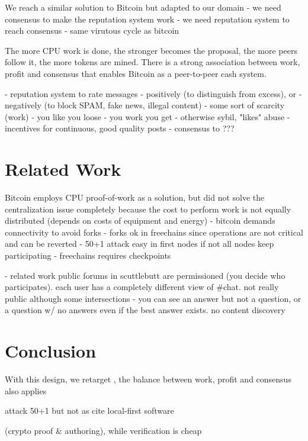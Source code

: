 \documentclass[10pt,journal,compsoc]{IEEEtran}
\begin{document}
We reach a similar solution to Bitcoin but adapted to our domain
- we need consensus to make the reputation system work
- we need reputation system to reach consensus
- same virutous cycle as bitcoin

The more CPU work is done, the stronger becomes the proposal, the more peers
follow it, the more tokens are mined.
There is a strong association between work, profit and consensus that enables
Bitcoin as a peer-to-peer cash system.

- reputation system to rate messages
    - positively (to distinguish from excess), or
    - negatively (to block SPAM, fake news, illegal content)
- some sort of scarcity (work)
    - you like you loose
    - you work you get
    - otherwise sybil, "likes" abuse
    - incentives for continuous, good quality posts
- consensus to ???

\section{Related Work}
\label{sec.related}

Bitcoin employs CPU proof-of-work as a solution, but did not solve the
centralization issue completely because the cost to perform work is not
equally distributed
(depends on costs of equipment and energy)
    - bitcoin demands connectivity to avoid forks
    - forks ok in freechains since operations are not critical and can be reverted
    - 50+1 attack easy in first nodes if not all nodes keep participating
        - freechains requires checkpoints

- related work public forums in scuttlebutt are permissioned (you decide who
  participates). each user has a completely different view of \#chat. not really
  public although some intersections
    - you can see an answer but not a question, or a question w/ no answers
      even if the best answer exists. no content discovery



\section{Conclusion}
\label{sec.conclusion}



With this design, we retarget  , the balance between work, profit and consensus also applies 

attack 50+1 but not as
cite local-first software

 (crypto proof \& authoring),
while verification is cheap
\end{document}
